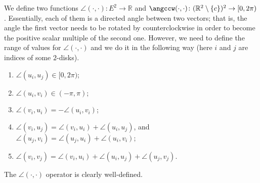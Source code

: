 We define two functions $\angle(\cdot, \cdot)\colon E^2\to\mathbb{R}$ and $\angccw(\cdot, \cdot)\colon (\mathbb{R}^2\setminus\{c\})^2\to[0, 2\pi)$. Essentially, each of them is a directed angle between two vectors; that is, the angle the first vector needs to be rotated by counterclockwise in order to become the positive scalar multiple of the second one. However, we need to define the range of values for $\angle(\cdot, \cdot)$ and we do it in the following way (here $i$ and $j$ are indices of some $2$-disks).

\begin{enumerate}[label={\{\arabic*\}}]
\item $\angle(u_i, u_j)\in[0, 2\pi)$; \label{rule:uu}
\item $\angle(u_i, v_i)\in(-\pi, \pi)$; \label{rule:uivi} %
\item $\angle(v_i, u_i) = -\angle(u_i, v_i)$; \label{rule:viui}
\item $\angle(v_i, u_j) = \angle(v_i, u_i) + \angle(u_i, u_j)$, and $\angle(u_j, v_i) = \angle(u_j, u_i) + \angle(u_i, v_i)$; \label{rule:uivj}
\item $\angle(v_i, v_j) = \angle(v_i, u_i) + \angle(u_i, u_j) + \angle(u_j, v_j)$. \label{rule:vv}
\end{enumerate}

The $\angle(\cdot, \cdot)$ operator is clearly well-defined.



